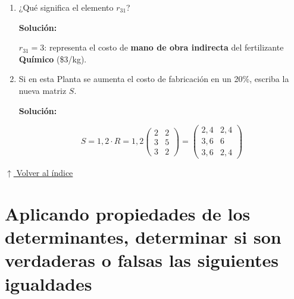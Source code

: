 \documentclass[12pt]{article}
\newcommand{\solucion}{%
    \vspace{0.8em}%
    \textbf{Solución:}%
}
\newcommand{\volverindice}{%
    \vspace{1em}%
    \begin{flushright}%
        \hyperlink{indice}{\small $\uparrow$ Volver al índice}%
    \end{flushright}%
}
\begin{document}
\begin{enumerate}[label=\alph*.-]
\begin{enumerate}[label=\roman*)]
        \item ¿Qué significa el elemento $r_{31}$?

        \solucion

        $r_{31}=3$: representa el costo de \textbf{mano de obra indirecta} del fertilizante \textbf{Químico} (\$3/kg).

        \item Si en esta Planta se aumenta el costo de fabricación en un 20\%, escriba la nueva matriz $S$.

        \solucion
        \[
        S = 1{,}2 \cdot R = 1{,}2\begin{pmatrix}2&2\\3&5\\3&2\end{pmatrix}
        = \begin{pmatrix}2{,}4&2{,}4\\3{,}6&6\\3{,}6&2{,}4\end{pmatrix}
        \]
    \end{enumerate}
\end{enumerate}

\volverindice
\newpage

\section{Aplicando propiedades de los determinantes, determinar si son verdaderas o falsas las siguientes igualdades}
\end{document}
